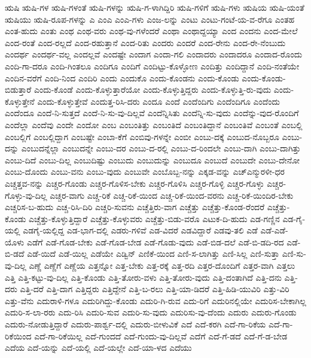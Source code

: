 ಋಷಿ
ಋಷಿ-ಗಳ
ಋಷಿ-ಗಳಂತೆ
ಋಷಿ-ಗಳನ್ನು
ಋಷಿ-ಗ-ಳಾಗಿದ್ದಿರಿ
ಋಷಿ-ಗಳಿಗೆ
ಋಷಿ-ಗಳು
ಋಷಿಯ
ಋಷಿ-ಯಂತೆ
ಋಷಿಯು
ಋಷಿ-ರೂಪ-ಗಳನ್ನು
ಎ
ಎಂಎ
ಎಂಎ-ಗಳು
ಎಂಜ-ಲನ್ನು
ಎಂಟು
ಎಂಟು-ಗಂಟೆ-ಯ-ವ-ರೆಗೂ
ಎಂತಹ
ಎಂತ-ಹುದು
ಎಂತು
ಎಂಥ
ಎಂಥ-ವರು
ಎಂಥ-ವು-ಗಳೆಂದರೆ
ಎಂಥಾ
ಎಂಥಾದ್ದಯ್ಯಾ
ಎಂದ
ಎಂದನು
ಎಂದ-ಮೇಲೆ
ಎಂದ-ರಂತೆ
ಎಂದ-ರಲ್ಲದೆ
ಎಂದ-ರಹುತ್ತಾನೆ
ಎಂದ-ರಿತು
ಎಂದರು
ಎಂದರೆ
ಎಂದ-ರೇನು
ಎಂದ-ರೇ-ನೆಂಬುದು
ಎಂದರ್ಥ
ಎಂದರ್ಥ-ವಲ್ಲ
ಎಂದಲ್ಲವೆ
ಎಂದಷ್ಟೇ
ಎಂದಾಗ
ಎಂದಾ-ಗಲಿ
ಎಂದಾದರು
ಎಂದಾದರೂ
ಎಂದಾದ-ರೊಂದು
ಎಂದಿ-ಗಾ-ದರೂ
ಎಂದಿ-ಗಿಂತಲೂ
ಎಂದಿಗೂ
ಎಂದಿಗೆ
ಎಂದಿಟ್ಟು-ಕೊಳ್ಳೋಣ
ಎಂದಿತ್ತು
ಎಂದಿದ್ದಾನೆ
ಎಂದಿ-ನಂತೆಯೇ
ಎಂದಿನ-ವರೆಗೆ
ಎಂದಿ-ನಿಂದ
ಎಂದಿರಿ
ಎಂದು
ಎಂದುಕೊ
ಎಂದು-ಕೊಂಡನು
ಎಂದು-ಕೊಂಡು
ಎಂದು-ಕೊಂಡು-ಬಿಡುತ್ತಾರೆ
ಎಂದು-ಕೊಂಡೆ
ಎಂದು-ಕೊಳ್ಳುತ್ತಾರೆಯೋ
ಎಂದು-ಕೊಳ್ಳುತ್ತಿದ್ದರು
ಎಂದು-ಕೊಳ್ಳುತ್ತಿ-ರು-ವುದು
ಎಂದು-ಕೊಳ್ಳುತ್ತೇನೆ
ಎಂದು-ಕೊಳ್ಳುತ್ತೇವೆ
ಎಂದುತ್ತ-ರಿಸಿ-ದರು
ಎಂದೂ
ಎಂದೆ
ಎಂದೆಂದಿಗು
ಎಂದೆಂದಿಗೂ
ಎಂದೆಂದು
ಎಂದೆಂದೂ
ಎಂದೆ-ನಿ-ಸುತ್ತದೆ
ಎಂದೆ-ನಿ-ಸು-ವು-ದಿಲ್ಲವೆ
ಎಂದೆನ್ನಿಸಿತು
ಎಂದೆನ್ನಿ-ಸು-ವುದು
ಎಂದೆನ್ನು-ವುದ-ರೊಂದಿಗೆ
ಎಂದೆಲ್ಲಾ
ಎಂದೆವು
ಎಂದೇ
ಎಂದೋ
ಎಂಬ
ಎಂಬಂತಿತ್ತು
ಎಂಬಂತಿದೆ
ಎಂಬಂತಿದ್ದಾನೆ
ಎಂಬಂತಿವೆ
ಎಂಬಂತೆ
ಎಂಬಲ್ಲಿ
ಎಂಬಲ್ಲಿಗೆ
ಎಂಬಲ್ಲಿದ್ದಾಗ
ಎಂಬಷ್ಟೇ
ಎಂಬಾ-ಕೆಗೆ
ಎಂಬಿವು-ಗಳನ್ನೇ
ಎಂಬೀ
ಎಂಬು-ದಕ್ಕೆ
ಎಂಬುದ-ನೊಬ್ಬರೂ
ಎಂಬು-ದನ್ನು
ಎಂಬುದನ್ನೆಲ್ಲಾ
ಎಂಬುದನ್ನೇ
ಎಂಬು-ದರ
ಎಂಬು-ದ-ರಲ್ಲಿ
ಎಂಬು-ದ-ರಿಂದಲೇ
ಎಂಬು-ದಾಗಿ
ಎಂಬು-ದಾಗಿತ್ತು
ಎಂಬು-ದಿದೆ
ಎಂಬು-ದಿಲ್ಲ
ಎಂಬುದಿಷ್ಟು
ಎಂಬುದು
ಎಂಬುದುನ್ನು
ಎಂಬುದೂ
ಎಂಬುದೆ
ಎಂಬುದೇ
ಎಂಬು-ದೇನೋ
ಎಂಬು-ದೊಂದು
ಎಂಬು-ವನು
ಎಂಬು-ವುದು
ಎಂಬುವೇ
ಎಂಬೊಬ್ಬ-ನನ್ನು
ಎಕ್ಕಡ-ವನ್ನು
ಎಚ್ಎನ್ಮುರಳೀ-ಧರ
ಎಚ್ಚತ್ತವ-ನನ್ನು
ಎಚ್ಚರ-ಗೊಂಡು
ಎಚ್ಚರ-ಗೊಳಿಸ-ಬೇಕು
ಎಚ್ಚರ-ಗೊಳಿಸಿ
ಎಚ್ಚರ-ಗೊಳ್ಳಿ
ಎಚ್ಚರ-ಗೊಳ್ಳು
ಎಚ್ಚರ-ಗೊಳ್ಳು-ವು-ದಿಲ್ಲ
ಎಚ್ಚರ-ವಾಗು
ಎಚ್ಚ-ರಿಕೆ
ಎಚ್ಚ-ರಿಕೆ-ಯಿಂದ
ಎಚ್ಚ-ರಿಕೆ-ಯಿಂದ-ವರನು
ಎಚ್ಚ-ರಿಕೆ-ಯಿಂದಿರ-ಬೇಕು
ಎಚ್ಚರಿಸ-ಬ-ಹುದು
ಎಚ್ಚ-ರಿಸಿ-ದಿರಿ
ಎಚ್ಚರಿ-ಸುವನು
ಎಚ್ಚೆತ್ತಿರು-ವಾಗ
ಎಚ್ಚೆತ್ತು
ಎಚ್ಚೆತ್ತು-ಕೊಂಡ-ರೆಂದರೆ
ಎಚ್ಚೆತ್ತು-ಕೊಂಡು
ಎಚ್ಚೆತ್ತು-ಕೊಳ್ಳುತ್ತಿದ್ದಾರೆ
ಎಚ್ಚೆತ್ತು-ಕೊಳ್ಳುವರು
ಎಚ್ಚೆತ್ತು-ಬಿಡು-ವರೊ
ಎಟುಕ-ದಿ-ಹುದು
ಎಡ-ಗಣ್ಣಿನ
ಎಡ-ಗೈ-ಯಲ್ಲಿ
ಎಡಗೈ-ಯಲ್ಲಿದ್ದ
ಎಡ-ಭಾಗ-ದಲ್ಲಿ
ಎಡರು-ಗಳಿವೆ
ಎಡ-ವಿದರೆ
ಎಡವಿದ್ದಾರೆ
ಎಡವು-ತಲಿ
ಎಡೆ
ಎಡೆ-ಎಡೆ-ಯೊಳು
ಎಡೆಗೆ
ಎಡೆ-ಗೊಡ-ಬೇಕು
ಎಡೆ-ಗೊಡ-ಬೇಡ
ಎಡೆ-ಗೊಡು-ವುದು
ಎಡೆ-ಬಿಡ-ದಲೆ
ಎಡೆ-ಬಿ-ಡದಿ-ರದ
ಎಡೆ-ಬಿ-ಡದೆ
ಎಡೆ-ಯಿದೆ
ಎಡೆ-ಯಿಲ್ಲ
ಎಡೆಯೇ
ಎಡ್ವಿನ್
ಎಣಿಕೆ-ಯಿಂದ
ಎಣಿ-ಸ-ಲಾಗಿತ್ತು
ಎಣಿ-ಸಿಲ್ಲ
ಎಣಿ-ಸುತ್ತಾ
ಎಣಿ-ಸು-ವು-ದಿಲ್ಲ
ಎಣ್ಣೆ
ಎಣ್ಣೆಗೆ
ಎಣ್ಣೆಯ
ಎತ್ತನ್ನೋ
ಎತ್ತ-ಬೇಕು
ಎತ್ತ-ರಕ್ಕೆ
ಎತ್ತ-ರದಿ
ಎತ್ತರ-ದೊಂದಿಗೆ
ಎತ್ತರ-ವಾಗಿ
ಎತ್ತಲು
ಎತ್ತಿ
ಎತ್ತಿ-ಕಟ್ಟು-ವು-ದಿಲ್ಲ
ಎತ್ತಿ-ಕೊಂಡು
ಎತ್ತಿ-ತೋರು-ವಳು
ಎತ್ತಿ-ತೋರು-ವುದು
ಎತ್ತಿ-ದಂತಾಗಿದೆ
ಎತ್ತಿ-ದನು
ಎತ್ತಿ-ದರು
ಎತ್ತಿ-ದರೆ
ಎತ್ತಿ-ದಾಗ
ಎತ್ತಿದ್ದರು
ಎತ್ತಿದ್ದೇನೆ
ಎತ್ತಿ-ಬ-ರಲು
ಎತ್ತಿ-ಯಾ-ಡಿದರೆ
ಎತ್ತಿ-ಹಿಡಿ-ಯುವಿರಿ
ಎತ್ತು-ವಿರಿ
ಎತ್ತು-ವೆನು
ಎದುರಾಳಿ-ಗಳೂ
ಎದುರಿಗಿದ್ದು-ಕೊಂಡು
ಎದುರಿ-ಗಿ-ರುವ
ಎದು-ರಿಗೆ
ಎದುರಿನಲ್ಲಿಯೇ
ಎದುರಿಸ-ಬೇಕಾಗಿಲ್ಲ
ಎದುರಿ-ಸ-ಲಾ-ರರು
ಎದು-ರಿಸಿ
ಎದುರಿ-ಸುವ
ಎದುರಿ-ಸು-ವುದು
ಎದುರಿಸು-ವು-ದೆಂದು
ಎದುರು
ಎದುರು-ಗೊಂಡು
ಎದುರು-ನೋಡುತ್ತಿದ್ದಾರೆ
ಎದುರು-ಪಾರ್ಶ್ವ-ದಲ್ಲಿ
ಎದುರು-ಬೀಳುವಿಕೆ
ಎದೆ
ಎದೆ-ಕರಗಿ
ಎದೆ-ಗಾ-ರಿಕೆಯ
ಎದೆ-ಗಾ-ರಿಕೆಯಿಂದ
ಎದೆ-ಗಾ-ರಿಕೆಯಿಲ್ಲ
ಎದೆ-ಗುಂದದೆ
ಎದೆ-ಗುಂದು-ವು-ದಿಲ್ಲವೆ
ಎದೆಗೆ
ಎದೆ-ಗೆ-ಡದೆ
ಎದೆ-ಗೆ-ಡ-ಬೇಡ
ಎದೆಯ
ಎದೆ-ಯನ್ನು
ಎದೆ-ಯಲ್ಲಿ
ಎದೆ-ಯಲ್ಲೇ
ಎದೆ-ಯಾ-ಳದ
ಎದೆಯು
